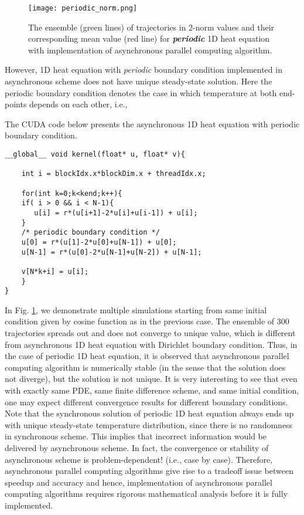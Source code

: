 \documentclass[1p]{elsarticle}
\begin{document}
\begin{figure}
\centering
\texttt{[image: periodic\_norm.png]}
\caption{The ensemble (green lines) of  trajectories in 2-norm values and their corresponding mean value (red line) for \textit{\textbf{periodic}} 1D heat equation with implementation of asynchronous parallel computing algorithm.}\label{fig.6}
\end{figure}

However, 1D heat equation with \textit{periodic} boundary condition implemented in asynchronous scheme does not have unique steady-state solution. Here the periodic boundary condition denotes the case in which temperature at both end-points depends on each other, i.e.,


The \textsf{CUDA} code below presents the asynchronous 1D heat equation with periodic boundary condition.

\begin{lstlisting}
__global__ void kernel(float* u, float* v){

    int i = blockIdx.x*blockDim.x + threadIdx.x;
  
    for(int k=0;k<kend;k++){
	if( i > 0 && i < N-1){
	   u[i] = r*(u[i+1]-2*u[i]+u[i-1]) + u[i];
	}
	/* periodic boundary condition */
	u[0] = r*(u[1]-2*u[0]+u[N-1]) + u[0];
	u[N-1] = r*(u[0]-2*u[N-1]+u[N-2]) + u[N-1];
	
	v[N*k+i] = u[i];
    }
}
\end{lstlisting}

In Fig. \ref{fig.6}, we demonstrate multiple simulations starting from same initial condition given by cosine function as in the previous case. The ensemble of 300 trajectories spreads out and does not converge to unique value, which is different from asynchronous 1D heat equation with Dirichlet boundary condition. Thus, in the case of periodic 1D heat equation, it is observed that asynchronous parallel computing algorithm is numerically stable (in the sense that the solution does not diverge), but the solution is not unique.
It is very interesting to see that even with exactly same PDE, same finite difference scheme, and same initial condition, one may expect different convergence results for different boundary conditions.
Note that the synchronous solution of periodic 1D heat equation always ends up with unique steady-state temperature distribution, since there is no randomness in synchronous scheme. This implies that incorrect information would be delivered 
by asynchronous scheme. In fact, the convergence or stability of asynchronous scheme is problem-dependent! (i.e., case by case). Therefore, asynchronous parallel computing algorithms give rise to a tradeoff issue between speedup and accuracy and hence, implementation of asynchronous parallel computing algorithms requires rigorous mathematical analysis before it is fully implemented.




\end{document}
